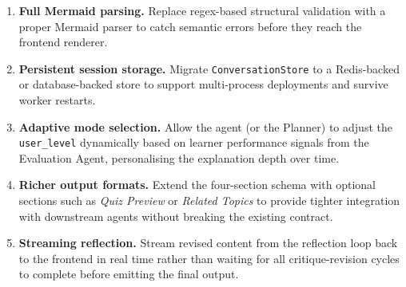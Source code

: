 \begin{enumerate}[leftmargin=*, label=\textbf{F\arabic*.}]

  \item \textbf{Full Mermaid parsing.}
  Replace regex-based structural validation with a proper Mermaid parser to catch semantic errors before they reach the frontend renderer.

  \item \textbf{Persistent session storage.}
  Migrate \texttt{ConversationStore} to a Redis-backed or database-backed store to support multi-process deployments and survive worker restarts.

  \item \textbf{Adaptive mode selection.}
  Allow the agent (or the Planner) to adjust the \texttt{user\_level} dynamically based on learner performance signals from the Evaluation Agent, personalising the explanation depth over time.

  \item \textbf{Richer output formats.}
  Extend the four-section schema with optional sections such as \textit{Quiz Preview} or \textit{Related Topics} to provide tighter integration with downstream agents without breaking the existing contract.

  \item \textbf{Streaming reflection.}
  Stream revised content from the reflection loop back to the frontend in real time rather than waiting for all critique-revision cycles to complete before emitting the final output.

\end{enumerate}

